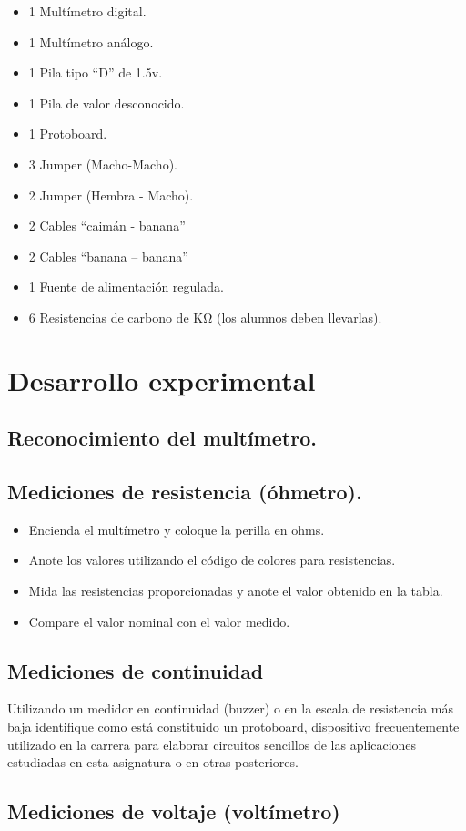 \documentclass[11pt]{article}
\begin{document}
\begin{multicols}{2}
\begin{itemize}
		\item1  Multímetro digital.
		\item1 Multímetro análogo.
		\item1 Pila tipo “D” de 1.5v.
		\item1 Pila de valor desconocido.
		\item1 Protoboard.  
		\item3 Jumper (Macho-Macho).
		\item2 Jumper (Hembra - Macho).
		\item2 Cables “caimán - banana”
		\item2 Cables “banana – banana”
		\item1 Fuente de alimentación regulada.
		\item6 Resistencias de carbono de KΩ (los alumnos deben llevarlas).

	\end{itemize}

\section{Desarrollo experimental}
	\subsection{Reconocimiento del multímetro.}
	
	\subsection{Mediciones de resistencia (óhmetro).}

	\begin{itemize}

		\item Encienda el multímetro y coloque la perilla en ohms.
		\item Anote los valores utilizando el código de colores para resistencias.
		\item Mida las resistencias proporcionadas y anote el valor obtenido en la tabla.
		\item Compare el valor nominal con el valor medido.

	\end{itemize}

	\subsection{Mediciones de continuidad}

Utilizando un medidor en continuidad (buzzer) o en la escala de resistencia más baja identifique como está constituido un protoboard, dispositivo frecuentemente utilizado en la carrera para elaborar circuitos sencillos de las aplicaciones estudiadas en esta asignatura o en otras posteriores.

	\subsection{Mediciones de voltaje (voltímetro)}


\end{multicols}
\end{document}
